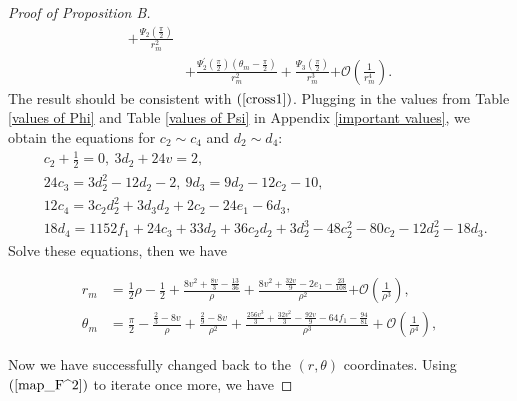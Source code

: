 \documentclass{article}
\numberwithin{figure}{section}
\numberwithin{equation}{section}
\theoremstyle{remark}
\theoremstyle{definition}
\begin{document}
\begin{proof}[Proof of Proposition B]
{\begin{equation}
\begin{split}
		+\frac{\Psi_{2}(\frac{\pi}{2})}{r_{m}^{2}} \\
		&+ \frac{\Psi_{2}^{'}(\frac{\pi}{2})\left( \theta_{m} - \frac{\pi}{2} \right)}{r_{m}^{2}} + \frac{\Psi_{3}(\frac{\pi}{2})}{r_{m}^{3}}\mathcal{+ O}\left( \frac{1}{r_{m}^{4}} \right).
        \end{split}
	\end{equation}
	The result should be consistent with $(\ref{cross1})$. Plugging in the values from Table \ref{values of Phi} and Table \ref{values of Psi} in Appendix \ref{important values}, we obtain the equations for $c_2 \sim c_4$ and $d_2\sim d_4$:
\begin{align*}
    &c_2+\frac{1}{2}=0,\ 3d_2+24v=2,\\
    &24c_3=3d_2^2-12d_2-2,\ 9d_3=9d_2-12c_2-10,\\
    &12c_4=3c_2d_2^2+3d_3d_2+2c_2-24e_1-6d_3,\\
    &18d_4 =1152f_1 +24c_3 +33d_2  +36c_2 d_2 +3d_2 ^3-48c_2 ^2 -80c_2 -12d_2 ^2 -18d_3.
\end{align*}
Solve these equations, then we have 

\begin{equation}\label{inverse Taylor}
		\begin{split}
			r_{m} &= \frac{1}{2}\rho - \frac{1}{2} + \frac{8v^2+\frac{8v}{3}-\frac{13}{36}}{\rho} + \frac{8v^2+\frac{32v}{9}-2e_1-\frac{23}{108}}{\rho^{2}}\mathcal{+ O}\left( \frac{1}{\rho^{3}} \right),\\
			\theta_{m} &= \frac{\pi}{2} - \frac{\frac{2}{3} - 8v}{\rho} + \frac{\frac{2}{9}-8v}{\rho^{2}} + \frac{\frac{256v^3}{3}+\frac{32v^2}{3}-\frac{92v}{9}-64f_1-\frac{94}{81}}{\rho^{3}} + \mathcal{O}\left( \frac{1}{\rho^{4}} \right),
		\end{split}
	\end{equation}
    }
    
    Now we have successfully changed back to the $(r,\theta)$ coordinates. Using $(\ref{map_F^2})$ to iterate once more, we have
	

\end{proof}
\end{document}
